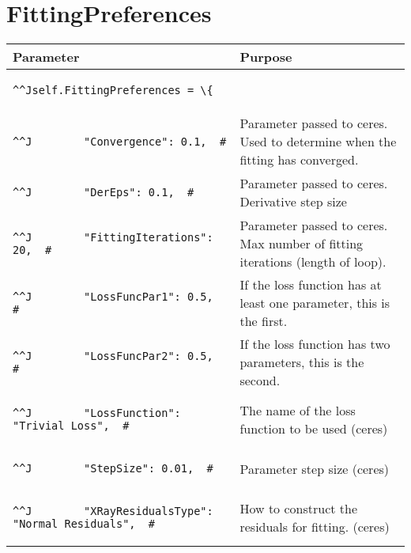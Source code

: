 \documentclass[12pt,a4paper,openany,oneside,oldfontcommands]{memoir}
\begin{document}
\section{FittingPreferences}	
\begin{tabularx}{\textwidth}{p{8cm} X}
	\toprule
	\textbf{Parameter}                              & \textbf{Purpose} \\
	\midrule
	\endhead
\begin{lstlisting}^^Jself.FittingPreferences = \{\end{lstlisting}    & \\
\begin{lstlisting}^^J        "Convergence": 0.1,  #\end{lstlisting}    & Parameter passed to ceres. Used to determine when the fitting has converged. \\
\begin{lstlisting}^^J        "DerEps": 0.1,  #\end{lstlisting}    & Parameter passed to ceres. Derivative step size\\
\begin{lstlisting}^^J        "FittingIterations": 20,  #\end{lstlisting}    & Parameter passed to ceres. Max number of fitting iterations (length of loop). \\
\begin{lstlisting}^^J        "LossFuncPar1": 0.5,  #\end{lstlisting}    & If the loss function has at least one parameter, this is the first.\\
\begin{lstlisting}^^J        "LossFuncPar2": 0.5,  #\end{lstlisting}    & If the loss function has two parameters, this is the second.\\
\begin{lstlisting}^^J        "LossFunction": "Trivial Loss",  #\end{lstlisting}    & The name of the loss function to be used (ceres) \\
\begin{lstlisting}^^J        "StepSize": 0.01,  #\end{lstlisting}    & Parameter step size (ceres) \\
\begin{lstlisting}^^J        "XRayResidualsType": "Normal Residuals",  #\end{lstlisting}    & How to construct the residuals for fitting. (ceres) \\

\end{tabularx}
\end{document}

